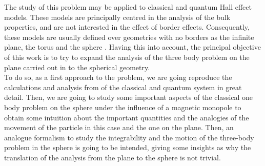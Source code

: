 The study of this problem may be applied to classical and quantum Hall effect models. These models are principally centred in the analysis of the bulk properties, and are not interested in the effect of border effects. Consequently, these models are usually defined over geometries with no borders as the infinite plane, the torus and the sphere \cite{schlief}. Having this into account, the principal objective of this work is to try to expand the analysis of the three body problem on the plane carried out in \cite{alonso} to the spherical geometry.\\

To do so, as a first approach to the problem, we are going reproduce the calculations and analysis from \cite{alonso} of the classical and quantum system in great detail. Then, we are going to study some important aspects of the classical one body problem on the sphere under the influence of a magnetic monopole to obtain some intuition about the important quantities and the analogies of the movement of the particle in this case and the one on the plane. Then, an analogue formalism to study the integrability and the motion of the three-body problem in the sphere is going to be intended, giving some insights as why the translation of the analysis from the plane to the sphere is not trivial.\\
